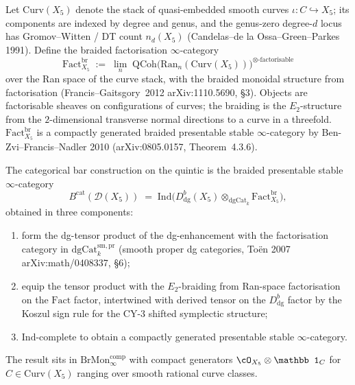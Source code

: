 \begin{definition}
\label{def:cy-c-quintic-fact-cat}
Let $\mathrm{Curv}(X_5)$ denote the stack of quasi-embedded smooth
curves $\iota : C \hookrightarrow X_5$; its components are indexed by
degree and genus, and the genus-zero degree-$d$ locus has
Gromov--Witten / DT count $n_d(X_5)$
(Candelas--de la Ossa--Green--Parkes 1991). Define the braided
factorisation $\infty$-category
\[
 \mathrm{Fact}^{\mathrm{br}}_{X_5}
 \;:=\;
 \lim_{n}\;
 \mathrm{QCoh}\bigl(\mathrm{Ran}_n(\mathrm{Curv}(X_5))\bigr)^{\otimes\text{-factorisable}}
\]
over the Ran space of the curve stack, with the braided monoidal
structure from factorisation (Francis--Gaitsgory~2012 arXiv:1110.5690,
\S 3). Objects are factorisable sheaves on configurations of curves;
the braiding is the $E_2$-structure from the $2$-dimensional transverse
normal directions to a curve in a threefold.
$\mathrm{Fact}^{\mathrm{br}}_{X_5}$ is a compactly generated braided
presentable stable $\infty$-category by Ben-Zvi--Francis--Nadler 2010
(arXiv:0805.0157, Theorem~4.3.6).
\end{definition}

\begin{theorem}
\label{thm:cy-c-quintic-bcat-explicit}
The categorical bar construction on the quintic is the braided
presentable stable $\infty$-category
\[
 B^{\mathrm{cat}}(\mathcal D(X_5))
 \;=\;
 \mathrm{Ind}\!\bigl(
 D^b_{\mathrm{dg}}(X_5) \otimes_{\mathrm{dgCat}_k}
 \mathrm{Fact}^{\mathrm{br}}_{X_5}
 \bigr),
\]
obtained in three components:
\begin{enumerate}[label=\textup{(\roman*)}]
 \item form the dg-tensor product of the dg-enhancement with the
 factorisation category in $\mathrm{dgCat}_k^{\mathrm{sm,pr}}$
 (smooth proper dg categories, To\"en 2007
 arXiv:math/0408337, \S 6);
 \item equip the tensor product with the $E_2$-braiding from
 Ran-space factorisation on the $\mathrm{Fact}$ factor,
 intertwined with derived tensor on the $D^b_{\mathrm{dg}}$
 factor by the Koszul sign rule for the CY-$3$ shifted
 symplectic structure;
 \item $\mathrm{Ind}$-complete to obtain a compactly generated
 presentable stable $\infty$-category.
\end{enumerate}
The result sits in $\mathrm{BrMon}^{\mathrm{comp}}_\infty$ with compact
generators $\cO_{X_5} \otimes \mathbb 1_C$ for
$C \in \mathrm{Curv}(X_5)$ ranging over smooth rational curve classes.
\end{theorem}

